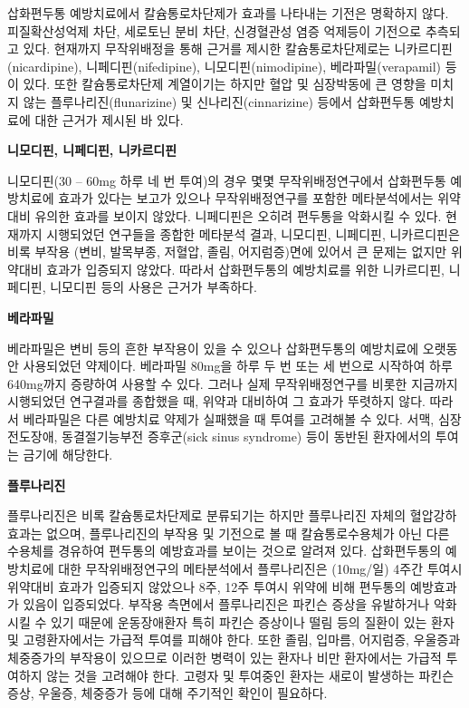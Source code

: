 \documentclass[]{book}
\begin{document}
삽화편두통 예방치료에서 칼슘통로차단제가 효과를 나타내는 기전은 명확하지 않다. 피질확산성억제 차단, 세로토닌 분비 차단, 신경혈관성 염증 억제등이 기전으로 추측되고 있다. 현재까지 무작위배정을 통해 근거를 제시한 칼슘통로차단제로는 니카르디핀(nicardipine), 니페디핀(nifedipine), 니모디핀(nimodipine), 베라파밀(verapamil) 등이 있다. 또한 칼슘통로차단제 계열이기는 하지만 혈압 및 심장박동에 큰 영향을 미치지 않는 플루나리진(flunarizine) 및 신나리진(cinnarizine) 등에서 삽화편두통 예방치료에 대한 근거가 제시된 바 있다.

\textbf{니모디핀, 니페디핀, 니카르디핀}

니모디핀(30 -- 60mg 하루 네 번 투여)의 경우 몇몇 무작위배정연구에서 삽화편두통 예방치료에 효과가 있다는 보고가 있으나 무작위배정연구를 포함한 메타분석에서는 위약대비 유의한 효과를 보이지 않았다. 니페디핀은 오히려 편두통을 악화시킬 수 있다. 현재까지 시행되었던 연구들을 종합한 메타분석 결과, 니모디핀, 니페디핀, 니카르디핀은 비록 부작용 (변비, 발목부종, 저혈압, 졸림, 어지럼증)면에 있어서 큰 문제는 없지만 위약대비 효과가 입증되지 않았다. 따라서 삽화편두통의 예방치료를 위한 니카르디핀, 니페디핀, 니모디핀 등의 사용은 근거가 부족하다.

\textbf{베라파밀}

베라파밀은 변비 등의 흔한 부작용이 있을 수 있으나 삽화편두통의 예방치료에 오랫동안 사용되었던 약제이다. 베라파밀 80mg을 하루 두 번 또는 세 번으로 시작하여 하루 640mg까지 증량하여 사용할 수 있다. 그러나 실제 무작위배정연구를 비롯한 지금까지 시행되었던 연구결과를 종합했을 때, 위약과 대비하여 그 효과가 뚜렷하지 않다. 따라서 베라파밀은 다른 예방치료 약제가 실패했을 때 투여를 고려해볼 수 있다. 서맥, 심장전도장애, 동결절기능부전 증후군(sick sinus syndrome) 등이 동반된 환자에서의 투여는 금기에 해당한다.

\textbf{플루나리진}

플루나리진은 비록 칼슘통로차단제로 분류되기는 하지만 플루나리진 자체의 혈압강하효과는 없으며, 플루나리진의 부작용 및 기전으로 볼 때 칼슘통로수용체가 아닌 다른 수용체를 경유하여 편두통의 예방효과를 보이는 것으로 알려져 있다. 삽화편두통의 예방치료에 대한 무작위배정연구의 메타분석에서 플루나리진은 (10mg/일) 4주간 투여시 위약대비 효과가 입증되지 않았으나 8주, 12주 투여시 위약에 비해 편두통의 예방효과가 있음이 입증되었다. 부작용 측면에서 플루나리진은 파킨슨 증상을 유발하거나 악화시킬 수 있기 때문에 운동장애환자 특히 파킨슨 증상이나 떨림 등의 질환이 있는 환자 및 고령환자에서는 가급적 투여를 피해야 한다. 또한 졸림, 입마름, 어지럼증, 우울증과 체중증가의 부작용이 있으므로 이러한 병력이 있는 환자나 비만 환자에서는 가급적 투여하지 않는 것을 고려해야 한다. 고령자 및 투여중인 환자는 새로이 발생하는 파킨슨 증상, 우울증, 체중증가 등에 대해 주기적인 확인이 필요하다.
\end{document}
